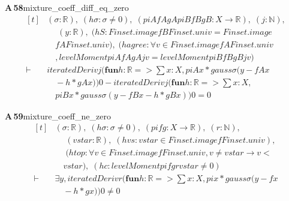 \documentclass[conference]{IEEEtran}
\theoremstyle{definition}
\newcommand{\lean}[1]{\textsf{\footnotesize #1}}
\begin{document}
\noindent\textbf{A\,58}\quad\lean{mixture\_coeff\_diff\_eq\_zero}
{\footnotesize\[ \begin{aligned}[t]
&(\sigma : \mathbb{R} ),\; (\mathit{hσ} : \sigma \neq 0),\; (\mathit{piA} \mathit{fA} \mathit{gA} \mathit{piB} \mathit{fB} \mathit{gB} : \mathit{X} \to \mathbb{R} ),\; (\mathit{j} : \mathbb{N} ),\\
&\quad \; (\mathit{y} : \mathbb{R} ),\; (\mathit{hS} : \mathit{Finset}.\mathit{image} \mathit{fB} \mathit{Finset}.\mathit{univ} = \mathit{Finset}.\mathit{image}\\
&\quad \mathit{fA} \mathit{Finset}.\mathit{univ}),\; (\mathit{hagree} : \forall \mathit{v} \in \mathit{Finset}.\mathit{image} \mathit{fA} \mathit{Finset}.\mathit{univ}\\
&\quad , \mathit{levelMoment} \mathit{piA} \mathit{fA} \mathit{gA} \mathit{j} \mathit{v} = \mathit{levelMoment} \mathit{piB} \mathit{fB} \mathit{gB} \mathit{j} \mathit{v})\\
\vdash\;&\mathit{iteratedDeriv} \mathit{j} (\mathbf{fun} \mathit{h} : \mathbb{R} => \textstyle\sum \mathit{x} : \mathit{X}, \mathit{piA} \mathit{x} * \mathit{gauss} \sigma (\mathit{y} - \mathit{fA} \mathit{x}\\
&\quad - \mathit{h} * \mathit{gA} \mathit{x})) 0 - \mathit{iteratedDeriv} \mathit{j} (\mathbf{fun} \mathit{h} : \mathbb{R} => \textstyle\sum \mathit{x} : \mathit{X},\\
&\quad \mathit{piB} \mathit{x} * \mathit{gauss} \sigma (\mathit{y} - \mathit{fB} \mathit{x} - \mathit{h} * \mathit{gB} \mathit{x})) 0 = 0
\end{aligned} \]}

\noindent\textbf{A\,59}\quad\lean{mixture\_coeff\_ne\_zero}
{\footnotesize\[ \begin{aligned}[t]
&(\sigma : \mathbb{R} ),\; (\mathit{hσ} : \sigma \neq 0),\; (\mathit{pi} \mathit{f} \mathit{g} : \mathit{X} \to \mathbb{R} ),\; (\mathit{r} : \mathbb{N} ),\\
&\quad \; (\mathit{vstar} : \mathbb{R} ),\; (\mathit{hvs} : \mathit{vstar} \in \mathit{Finset}.\mathit{image} \mathit{f} \mathit{Finset}.\mathit{univ}),\\
&\quad \; (\mathit{htop} : \forall \mathit{v} \in \mathit{Finset}.\mathit{image} \mathit{f} \mathit{Finset}.\mathit{univ}, \mathit{v} \neq \mathit{vstar} \to \mathit{v} <\\
&\quad \mathit{vstar}),\; (\mathit{hc} : \mathit{levelMoment} \mathit{pi} \mathit{f} \mathit{g} \mathit{r} \mathit{vstar} \neq 0)\\
\vdash\;&\exists \mathit{y}, \mathit{iteratedDeriv} \mathit{r} (\mathbf{fun} \mathit{h} : \mathbb{R} => \textstyle\sum \mathit{x} : \mathit{X}, \mathit{pi} \mathit{x} * \mathit{gauss} \sigma (\mathit{y} - \mathit{f} \mathit{x}\\
&\quad - \mathit{h} * \mathit{g} \mathit{x})) 0 \neq 0
\end{aligned} \]}
\end{document}
